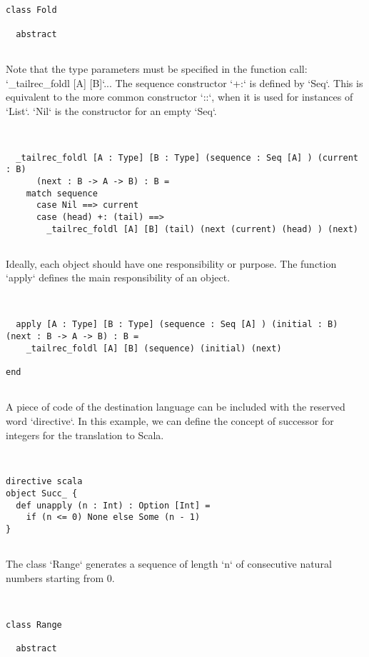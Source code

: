 \documentclass[12pt,a4paper]{article}
\begin{document}
\begin{lstlisting}


class Fold

  abstract


\end{lstlisting}

  Note that the type parameters must be specified in the function call:
   `_tailrec_foldl [A] [B]`...
   The sequence constructor `+:` is defined by `Seq`.
   This is equivalent to the more common constructor `::`, when it is used for instances of
   `List`. `Nil` is the constructor for an empty `Seq`.


\begin{lstlisting}


  _tailrec_foldl [A : Type] [B : Type] (sequence : Seq [A] ) (current : B)
      (next : B -> A -> B) : B =
    match sequence
      case Nil ==> current
      case (head) +: (tail) ==>
        _tailrec_foldl [A] [B] (tail) (next (current) (head) ) (next)


\end{lstlisting}

  Ideally, each object should have one responsibility or purpose. The function `apply`
   defines the main responsibility of an object.


\begin{lstlisting}


  apply [A : Type] [B : Type] (sequence : Seq [A] ) (initial : B) (next : B -> A -> B) : B =
    _tailrec_foldl [A] [B] (sequence) (initial) (next)

end


\end{lstlisting}

A piece of code of the destination language can be included with the reserved word
 `directive`. In this example, we can define the concept of successor for integers for the
 translation to Scala.


\begin{lstlisting}


directive scala
object Succ_ {
  def unapply (n : Int) : Option [Int] =
    if (n <= 0) None else Some (n - 1)
}


\end{lstlisting}

The class `Range` generates a sequence of length `n` of consecutive natural numbers starting
 from 0.


\begin{lstlisting}


class Range

  abstract


\end{lstlisting}
\end{document}
